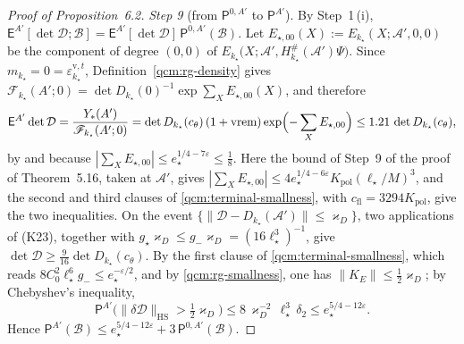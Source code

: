 \documentclass[11pt,letterpaper,reqno]{amsart}
\theoremstyle{definition}
\begin{document}
\begin{proof}[Proof of Proposition~6.2]
\emph{Step 9} (from $\mathsf P^{0,A'}$ to $\mathsf P^{A'}$).
By Step~1\,(i), $\mathsf E^{A'}[\det\mathcal D;\mathcal B]=\allowbreak \mathsf E^{A'}[\det\mathcal D]\,\allowbreak \mathsf P^{0,A'}(\mathcal B)$.
Let $E_{\star,00}(X):=E_{k_\star}(X;\mathscr A',0,0)$ be the component of degree $(0,0)$ of $E_{k_\star}\bigl(X;\mathscr A',\allowbreak H^\#_{k_\star}(\mathscr A')\Psi\bigr)$.
Since $m_{k_\star}=0=\varepsilon^{\mathrm v,t}_{k_\star}$, Definition~\ref{qcm:rg-density} gives $\mathscr F_{k_\star}(A';0)=\det D_{k_\star}(0)^{-1}\exp\sum_XE_{\star,00}(X)$, and therefore
\begin{equation*}
\mathsf E^{A'}\det\mathcal D=\frac{Y_*(A')}{\mathscr F_{k_\star}(A';0)}=\det D_{k_\star}(c_\theta)\,(1+\mathrm{vrem})\exp\Bigl(-\sum_XE_{\star,00}\Bigr)\le1.21\,\det D_{k_\star}(c_\theta),
\end{equation*}
by \cite[Proposition~22.5, equation~(22.31), and its proof]{QEDConstruction} and because $|\sum_XE_{\star,00}|\le e_\star^{1/4-7\varepsilon}\le\frac18$.
Here the bound of Step~9 of the proof of Theorem~5.16, taken at $\mathscr A'$, gives $|\sum_XE_{\star,00}|\le4e_\star^{1/4-6\varepsilon}K_{\mathrm{pol}}(\ell_\star/M)^3$, and the second and third clauses of \eqref{qcm:terminal-smallness}, with $c_{\mathrm{fl}}=3294K_{\mathrm{pol}}$, give the two inequalities.
On the event $\{\|\mathcal D-D_{k_\star}(\mathscr A')\|\le\varkappa_D\}$, two applications of (K23), together with $g_\star\varkappa_D\le g_-\varkappa_D=(16\ell_\star^3)^{-1}$, give $\det\mathcal D\ge\frac9{16}\det D_{k_\star}(c_\theta)$.
By the first clause of \eqref{qcm:terminal-smallness}, which reads $8C_0^2\ell_\star^6g_-\le e_\star^{-\varepsilon/2}$, and by \eqref{qcm:rg-smallness}, one has $\|K_E\|\le\frac12\varkappa_D$;
by Chebyshev's inequality,
\begin{equation*}
\mathsf P^{A'}\bigl(\|\delta\mathcal D\|_{\mathrm{HS}}>\tfrac12\varkappa_D\bigr)\le8\,\varkappa_D^{-2}\,\ell_\star^3\,\delta_2\le e_\star^{5/4-12\varepsilon}.
\end{equation*}
Hence $\mathsf P^{A'}(\mathcal B)\le e_\star^{5/4-12\varepsilon}+3\,\allowbreak \mathsf P^{0,A'}(\mathcal B)$.


\end{proof}
\end{document}
